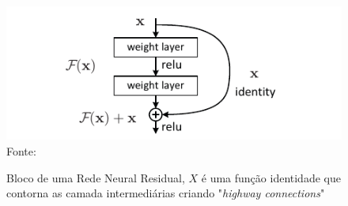 			\begin{figure}
				\centering
				\caption[bloco de uma Resnet]{Bloco de uma Rede Neural Residual, $X$ é uma função identidade que contorna as camada intermediárias criando "\textit{highway connections}"}
				\includegraphics[width=0.7\linewidth]{images/residualBlock}
				\\ Fonte: \cite{DBLP:journals/corr/HeZRS15}
				\label{fig:residualblock}
			\end{figure}